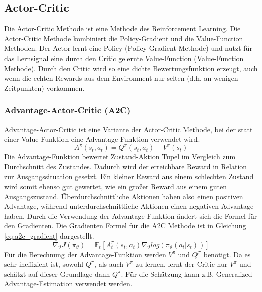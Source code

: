 \subsection{Actor-Critic}
Die Actor-Critic Methode ist eine Methode des Reinforcement Learning. Die Actor-Critic Methode kombiniert die Policy-Gradient und die Value-Function Methoden. Der Actor lernt eine Policy (Policy Gradient Methode) und nutzt für das Lernsignal eine durch den Critic gelernte Value-Function (Value-Function Methode). Durch den Critic wird so eine dichte Bewertungsfunktion erzeugt, auch wenn die echten Rewards aus dem Environment nur selten (d.h. an wenigen Zeitpunkten) vorkommen. 

\subsubsection{Advantage-Actor-Critic (A2C)}
Advantage-Actor-Critic ist eine Variante der Actor-Critic Methode, bei der statt einer Value-Funktion eine Advantage-Funktion verwendet wird.
\begin{equation}
    A^\pi(s_t,a_t) = Q^\pi(s_t,a_t) - V^\pi(s_t)
    \label{eq:advantage_function}
\end{equation}
Die Advantage-Funktion bewertet Zustand-Aktion Tupel im Vergleich zum Durchschnitt des Zustandes. Dadurch wird der erreichbare Reward in Relation zur Ausgangssituation gesetzt. Ein kleiner Reward aus einem schlechten Zustand wird somit ebenso gut gewertet, wie ein großer Reward aus einem guten Ausgangszustand. Überdurchschnittliche Aktionen haben also einen positiven Advantage, während unterdurchschnittliche Aktionen einen negativen Advantage haben.
Durch die Verwendung der Advantage-Funktion ändert sich die Formel für den Gradienten. Die Gradienten Formel für die A2C Methode ist in Gleichung \ref{eq:a2c_gradient} dargestellt.
\begin{equation}
    \nabla_\vartheta J(\pi_\vartheta) = \mathbb{E}_t\left[ A_t^\pi (s_t,a_t) \nabla_\vartheta log(\pi_\vartheta(a_t\vert s_t))\right]
    \label{eq:a2c_gradient}
\end{equation}
Für die Berechnung der Advantage-Funktion werden $V^\pi$ und $Q^\pi$ benötigt. Da es sehr ineffizient ist, sowohl $Q^\pi$, als auch $V^\pi$ zu lernen, lernt der Critic nur $V^\pi$ und schätzt auf dieser Grundlage dann $Q^\pi$. Für die Schätzung kann z.B. Generalized-Advantage-Estimation verwendet werden. \cite{FoundationsDeepRL}


